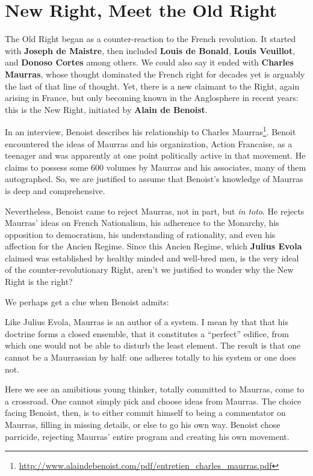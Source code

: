 \section{New Right, Meet the Old Right}

The Old Right began as a counter-reaction to the French revolution. It started with \textbf{Joseph de Maistre}, then included \textbf{Louis de Bonald}, \textbf{Louis Veuillot}, and \textbf{Donoso Cortes} among others. We could also say it ended with \textbf{Charles Maurras}, whose thought dominated the French right for decades yet is arguably the last of that line of thought. Yet, there is a new claimant to the Right, again arising in France, but only becoming known in the Anglosphere in recent years: this is the New Right, initiated by \textbf{Alain de Benoist}.

In an interview, Benoist describes his relationship to Charles Maurras\footnote{\url{http://www.alaindebenoist.com/pdf/entretien\_charles\_maurras.pdf}}. Benoit encountered the ideas of Maurras and his organization, Action Francaise, as a teenager and was apparently at one point politically active in that movement. He claims to possess some 600 volumes by Maurras and his associates, many of them autographed. So, we are justified to assume that Benoist's knowledge of Maurras is deep and comprehensive.

Nevertheless, Benoist came to reject Maurras, not in part, but \emph{in toto}. He rejects Maurras' ideas on French Nationalism, his adherence to the Monarchy, his opposition to democratism, his understanding of rationality, and even his affection for the Ancien Regime. Since this Ancien Regime, which \textbf{Julius Evola} claimed was established by healthy minded and well-bred men, is the very ideal of the counter-revolutionary Right, aren't we justified to wonder why the New Right is the right?

We perhaps get a clue when Benoist admits:

\begin{quotex}
Like Julius Evola, Maurras is an author of a system. I mean by that that his doctrine forms a closed ensemble, that it constitutes a ``perfect'' edifice, from which one would not be able to disturb the least element. The result is that one cannot be a Maurrassian by half: one adheres totally to his system or one does not.
\end{quotex}


Here we see an amibitious young thinker, totally committed to Maurras, come to a crossroad. One cannot simply pick and choose ideas from Maurras. The choice facing Benoist, then, is to either commit himself to being a commentator on Maurras, filling in missing details, or else to go his own way. Benoist chose parricide, rejecting Maurras' entire program and creating his own movement.

